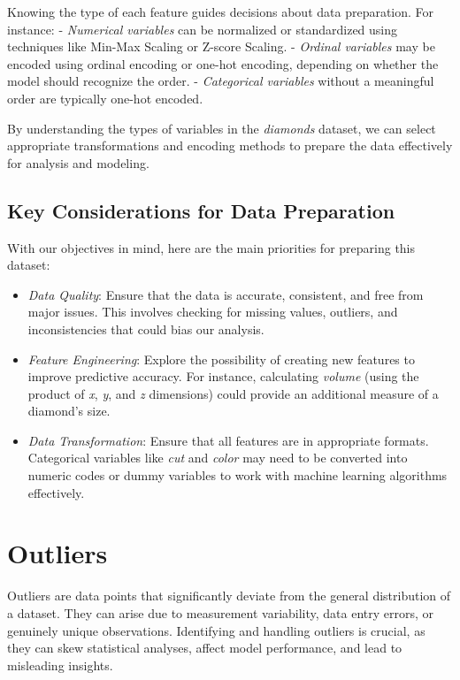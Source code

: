 \documentclass[
]{book}
\providecommand{\tightlist}{%
  \setlength{\itemsep}{0pt}\setlength{\parskip}{0pt}}
\theoremstyle{definition}
\theoremstyle{definition}
\theoremstyle{definition}
\theoremstyle{definition}
\theoremstyle{remark}
\begin{document}
Knowing the type of each feature guides decisions about data preparation. For instance:
- \emph{Numerical variables} can be normalized or standardized using techniques like Min-Max Scaling or Z-score Scaling.
- \emph{Ordinal variables} may be encoded using ordinal encoding or one-hot encoding, depending on whether the model should recognize the order.
- \emph{Categorical variables} without a meaningful order are typically one-hot encoded.

By understanding the types of variables in the \emph{diamonds} dataset, we can select appropriate transformations and encoding methods to prepare the data effectively for analysis and modeling.

\subsection*{Key Considerations for Data Preparation}\label{key-considerations-for-data-preparation}

With our objectives in mind, here are the main priorities for preparing this dataset:

\begin{itemize}
\tightlist
\item
  \emph{Data Quality}: Ensure that the data is accurate, consistent, and free from major issues. This involves checking for missing values, outliers, and inconsistencies that could bias our analysis.
\item
  \emph{Feature Engineering}: Explore the possibility of creating new features to improve predictive accuracy. For instance, calculating \emph{volume} (using the product of \emph{x}, \emph{y}, and \emph{z} dimensions) could provide an additional measure of a diamond's size.
\item
  \emph{Data Transformation}: Ensure that all features are in appropriate formats. Categorical variables like \emph{cut} and \emph{color} may need to be converted into numeric codes or dummy variables to work with machine learning algorithms effectively.
\end{itemize}

\section{Outliers}\label{outliers}

Outliers are data points that significantly deviate from the general distribution of a dataset. They can arise due to measurement variability, data entry errors, or genuinely unique observations. Identifying and handling outliers is crucial, as they can skew statistical analyses, affect model performance, and lead to misleading insights.
\end{document}
